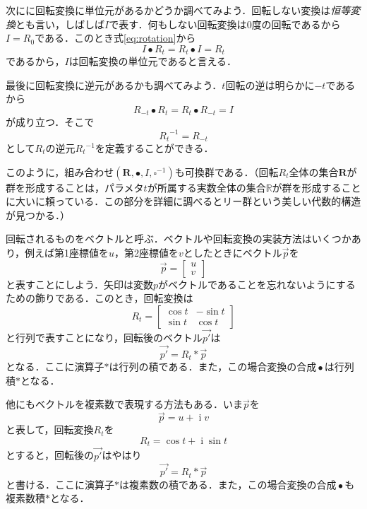 \documentclass[twocolumn]{jsbook}
\newcommand{\keyword}[1]{{\emph{#1}}}
\DeclareMathOperator{\mathCompose}{\bullet}
\DeclareMathOperator{\mathI}{i}
\newcommand{\mathSomething}{\square}
\newcommand{\mathSet}[1]{\mathbf{#1}} %
\newcommand{\mathSpecialSet}[1]{\mathbb{#1}} %
\newcommand{\mathVector}[1]{\vec{#1}}
\newcommand{\mathGroup}[4]{(#1,#2,#3,#4)}
\begin{document}
次にに回転変換に単位元があるかどうか調べてみよう．回転しない変換は\keyword{恒等変換}とも言い，しばしば$I$で表す．何もしない回転変換は$0$度の回転であるから$I=R_0$である．このとき式\eqref{eq:rotation}から
\begin{equation}
I\bullet R_t=R_t\bullet I=R_t
\end{equation}
であるから，$I$は回転変換の単位元であると言える．

最後に回転変換に逆元があるかも調べてみよう．$t$回転の逆は明らかに$-t$であるから
\begin{equation}
R_{-t}\bullet R_t=R_t\bullet R_{-t}=I
\end{equation}
が成り立つ．そこで
\begin{equation}
{R_t}^{-1}=R_{-t}
\end{equation}
として$R_t$の逆元${R_t}^{-1}$を定義することができる．

このように，組み合わせ$\mathGroup{\mathSet{R}}{\bullet}{I}{\mathSomething^{-1}}$も可換群である．（回転$R_t$全体の集合$\mathSet{R}$が群を形成することは，パラメタ$t$が所属する実数全体の集合$\mathSpecialSet{R}$が群を形成することに大いに頼っている．この部分を詳細に調べるとリー群という美しい代数的構造が見つかる．）

回転されるものをベクトルと呼ぶ．ベクトルや回転変換の実装方法はいくつかあり，例えば第1座標値を$u$，第2座標値を$v$としたときにベクトル$\mathVector{p}$を
\begin{equation}
\mathVector{p}=\begin{bmatrix}u\\v\end{bmatrix}
\end{equation}
と表すことにしよう．矢印は変数$p$がベクトルであることを忘れないようにするための飾りである．このとき，回転変換は
\begin{equation}
R_t=\begin{bmatrix}\cos t&-\sin t\\\sin t&\cos t\end{bmatrix}
\end{equation}
と行列で表すことになり，回転後のベクトル$\mathVector{p'}$は
\begin{equation}
\mathVector{p'}=R_t*\mathVector{p}
\end{equation}
となる．ここに演算子$*$は行列の積である．また，この場合変換の合成$\mathCompose$は行列積$*$となる．

他にもベクトルを複素数で表現する方法もある．いま$\mathVector{p}$を
\begin{equation}
\mathVector{p}=u+\mathI v
\end{equation}
と表して，回転変換$R_t$を
\begin{equation}
R_t=\cos t+\mathI\sin t
\end{equation}
とすると，回転後の$\mathVector{p'}$はやはり
\begin{equation}
\mathVector{p'}=R_t*\mathVector{p}
\end{equation}
と書ける．ここに演算子$*$は複素数の積である．また，この場合変換の合成$\mathCompose$も複素数積$*$となる．
\end{document}
